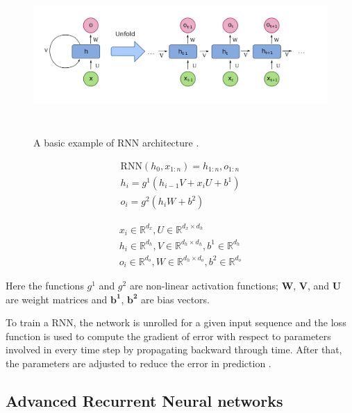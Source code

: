 \documentclass[a4paper, 11pt]{article}
\begin{document}
\begin{figure}[htpb!]
    \centering
    \includegraphics[width=\textwidth,height=6cm,keepaspectratio=true]
    {Recurrent_neural_network_unfold.png}
    \caption{
        A basic example of RNN architecture \parencite{rnn-1}.
    }
    \label{fig:A basic RNN architecture}
\end{figure}

\begin{align*}
\mathrm{RNN}(h_0,x_{1:n}) = h_{1:n}, o_{1:n} \\
h_i = g^1(h_{i-1}V + x_iU + b^1) \\
o_i = g^2(h_iW + b^2) 
\end{align*}

\begin{align*}
x_i \in \mathbb{R}^{d_x}, U \in \mathbb{R}^{d_x \times d_h} \\
h_i \in \mathbb{R}^{d_h}, V \in \mathbb{R}^{d_h \times d_h}, b^1 \in \mathbb{R}^{d_h} \\
o_i \in \mathbb{R}^{d_o}, W \in \mathbb{R}^{d_h \times d_o}, b^2 \in \mathbb{R}^{d_o}
\end{align*}

Here the functions $g^{1}$ and $g^{2}$ are non-linear activation functions; $\mathbf{W}$, $\mathbf{V}$, and $\mathbf{U}$ are weight matrices and $\mathbf{b^{1}}$, $\mathbf{b^{2}}$ are bias vectors. 

To train a RNN, the network is unrolled for a given input sequence and the loss function is used to compute the gradient of error with respect to parameters involved in every time step by propagating backward through time. After that, the parameters are adjusted to reduce the error in prediction \parencite{Werbos1990}. 

\subsection{Advanced Recurrent Neural networks }
\end{document}
